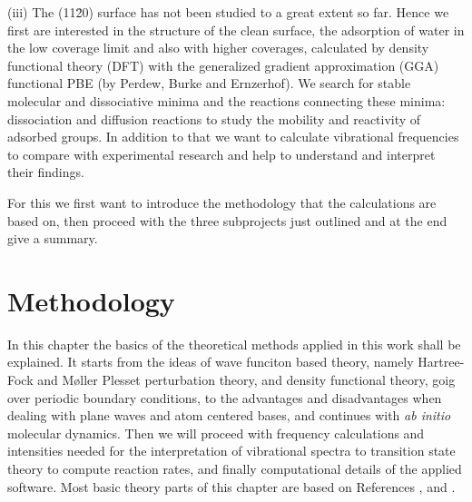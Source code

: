 \documentclass[11pt,DIV=13,BCOR=5mm,a4paper,headinclude]{scrbook}
\begin{document}
(iii) The (11\=20) surface has not been studied to a great extent so far.
Hence we first are interested in the structure of the clean surface, the adsorption of water in the low coverage limit and also with higher coverages, calculated by density functional theory (DFT) with the  generalized gradient approximation (GGA) functional PBE (by Perdew, Burke and Ernzerhof).
We search for stable molecular and dissociative minima and the reactions connecting these minima: dissociation and diffusion reactions to study the mobility and reactivity of adsorbed groups.
In addition to that we want to calculate vibrational frequencies to compare with experimental research and help to understand and interpret their findings.


For this we first want to introduce the methodology that the calculations are based on, then proceed with the three subprojects just outlined and at the end give a summary.


\chapter{Methodology}
In this chapter the basics of the theoretical methods applied in this work shall be explained.
It starts from the ideas of wave funciton based theory, namely Hartree-Fock and M\o{}ller Plesset perturbation theory, and density functional theory, goig over periodic boundary conditions, to the advantages and disadvantages when dealing with plane waves and atom centered bases, and continues with \textit{ab initio} molecular dynamics.
Then we will proceed with frequency calculations and intensities needed for the interpretation of vibrational spectra to transition state theory to compute reaction rates, and finally computational details of the applied software.
Most basic theory parts of this chapter are based on References \cite{jensen}, \cite{Gross03} and \cite{szabo}.
\end{document}

